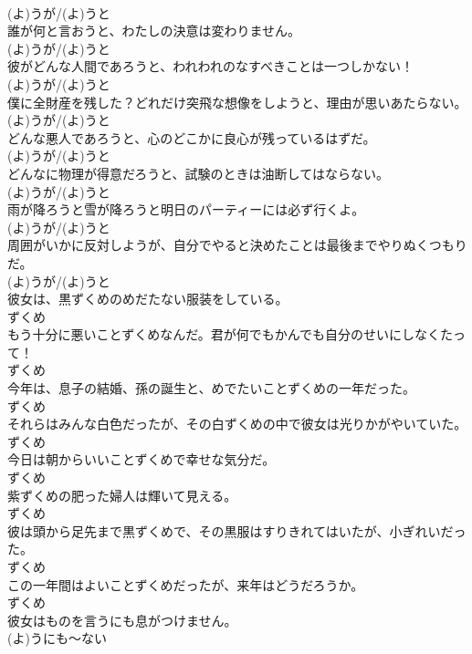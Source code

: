 \documentclass[8pt]{extreport}
\begin{document}
\begin{CJK}{UTF8}{min}
\\	(よ)うが/(よ)うと
\\	誰が何と言おうと、わたしの決意は変わりません。	
\\	(よ)うが/(よ)うと
\\	彼がどんな人間であろうと、われわれのなすべきことは一つしかない！	
\\	(よ)うが/(よ)うと
\\	僕に全財産を残した？どれだけ突飛な想像をしようと、理由が思いあたらない。	
\\	(よ)うが/(よ)うと
\\	どんな悪人であろうと、心のどこかに良心が残っているはずだ。	
\\	(よ)うが/(よ)うと
\\	どんなに物理が得意だろうと、試験のときは油断してはならない。	
\\	(よ)うが/(よ)うと
\\	雨が降ろうと雪が降ろうと明日のパーティーには必ず行くよ。	
\\	(よ)うが/(よ)うと
\\	周囲がいかに反対しようが、自分でやると決めたことは最後までやりぬくつもりだ。	
\\	(よ)うが/(よ)うと
\\	彼女は、黒ずくめのめだたない服装をしている。	
\\	ずくめ
\\	もう十分に悪いことずくめなんだ。君が何でもかんでも自分のせいにしなくたって！	
\\	ずくめ
\\	今年は、息子の結婚、孫の誕生と、めでたいことずくめの一年だった。	
\\	ずくめ
\\	それらはみんな白色だったが、その白ずくめの中で彼女は光りかがやいていた。	
\\	ずくめ
\\	今日は朝からいいことずくめで幸せな気分だ。	
\\	ずくめ
\\	紫ずくめの肥った婦人は輝いて見える。	
\\	ずくめ
\\	彼は頭から足先まで黒ずくめで、その黒服はすりきれてはいたが、小ぎれいだった。	
\\	ずくめ
\\	この一年間はよいことずくめだったが、来年はどうだろうか。	
\\	ずくめ
\\	彼女はものを言うにも息がつけません。	
\\	(よ)うにも～ない

\end{CJK}
\end{document}
